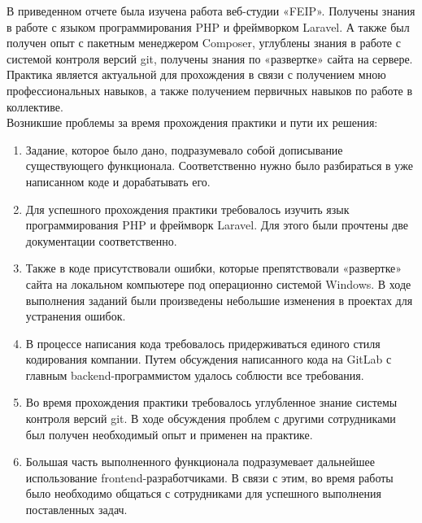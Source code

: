 
В приведенном отчете была изучена работа веб-студии «FEIP». Получены знания в работе с языком 
программирования PHP и фреймворком Laravel. А также был получен опыт с пакетным менеджером Composer, 
углублены знания в работе с системой контроля версий git, получены знания по «развертке» сайта на сервере.
Практика является актуальной для прохождения в связи с получением мною профессиональных навыков, а также 
получением первичных навыков по работе в коллективе.\\

Возникшие проблемы за время прохождения практики и пути их решения:
\begin{enumerate}
    \item Задание, которое было дано, подразумевало собой дописывание существующего функционала.
    Соответственно нужно было разбираться в уже написанном коде и дорабатывать его.
    \item Для успешного прохождения практики требовалось изучить язык программирования PHP и 
    фреймворк Laravel. Для этого были прочтены две документации соответственно.
    \item Также в коде присутствовали ошибки, которые препятствовали «развертке» сайта на локальном
    компьютере под операционно системой Windows. В ходе выполнения заданий были произведены небольшие 
    изменения в проектах для устранения ошибок.
    \item В процессе написания кода требовалось придерживаться единого стиля кодирования компании. Путем 
    обсуждения написанного кода на GitLab с главным backend-программистом удалось соблюсти все требования.
    \item Во время прохождения практики требовалось углубленное знание системы контроля версий git. В ходе 
    обсуждения проблем с другими сотрудниками был получен необходимый опыт и применен на практике.
    \item Большая часть выполненного функционала подразумевает дальнейшее использование frontend-разработчиками.
    В связи с этим, во время работы было необходимо общаться с сотрудниками для успешного выполнения поставленных 
    задач. 
\end{enumerate}
